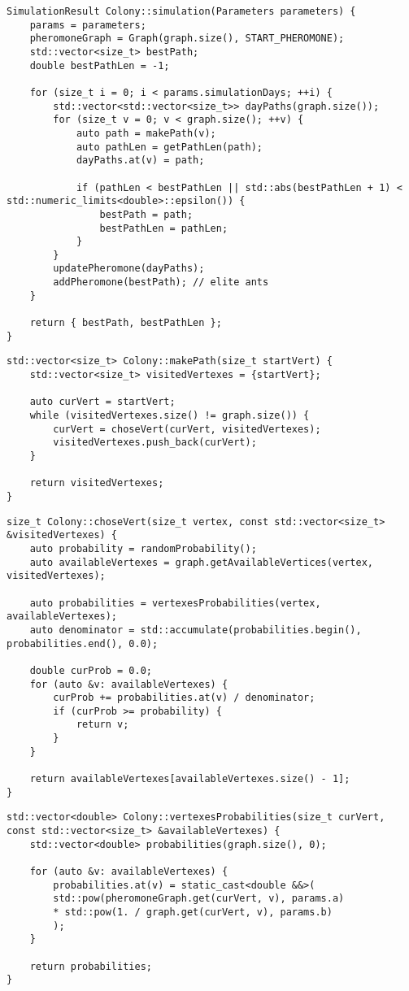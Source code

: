 \clearpage
\begin{lstlisting}[label=lst:ant,caption=Муравьиный алгоритм]
SimulationResult Colony::simulation(Parameters parameters) {
	params = parameters;
	pheromoneGraph = Graph(graph.size(), START_PHEROMONE);
	std::vector<size_t> bestPath;
	double bestPathLen = -1;
	
	for (size_t i = 0; i < params.simulationDays; ++i) {
		std::vector<std::vector<size_t>> dayPaths(graph.size());
		for (size_t v = 0; v < graph.size(); ++v) {
			auto path = makePath(v);
			auto pathLen = getPathLen(path);
			dayPaths.at(v) = path;
			
			if (pathLen < bestPathLen || std::abs(bestPathLen + 1) < std::numeric_limits<double>::epsilon()) {
				bestPath = path;
				bestPathLen = pathLen;
			}
		}
		updatePheromone(dayPaths);
		addPheromone(bestPath); // elite ants
	}
	
	return { bestPath, bestPathLen };
}
\end{lstlisting}

\begin{lstlisting}[label=lst:makePath,caption=Построение маршрута]
std::vector<size_t> Colony::makePath(size_t startVert) {
	std::vector<size_t> visitedVertexes = {startVert};
	
	auto curVert = startVert;
	while (visitedVertexes.size() != graph.size()) {
		curVert = choseVert(curVert, visitedVertexes);
		visitedVertexes.push_back(curVert);
	}
	
	return visitedVertexes;
}
\end{lstlisting}

\begin{lstlisting}[label=lst:nextV,caption=выбор следующей вершины]
size_t Colony::choseVert(size_t vertex, const std::vector<size_t> &visitedVertexes) {
	auto probability = randomProbability();
	auto availableVertexes = graph.getAvailableVertices(vertex, visitedVertexes);
	
	auto probabilities = vertexesProbabilities(vertex, availableVertexes);
	auto denominator = std::accumulate(probabilities.begin(), probabilities.end(), 0.0);
	
	double curProb = 0.0;
	for (auto &v: availableVertexes) {
		curProb += probabilities.at(v) / denominator;
		if (curProb >= probability) {
			return v;
		}
	}
	
	return availableVertexes[availableVertexes.size() - 1];
}
\end{lstlisting}

\begin{lstlisting}[label=lst:prob,caption=получение вероятностей перехода в доступные вершины]
std::vector<double> Colony::vertexesProbabilities(size_t curVert, const std::vector<size_t> &availableVertexes) {
	std::vector<double> probabilities(graph.size(), 0);
	
	for (auto &v: availableVertexes) {
		probabilities.at(v) = static_cast<double &&>(
		std::pow(pheromoneGraph.get(curVert, v), params.a)
		* std::pow(1. / graph.get(curVert, v), params.b)
		);
	}
	
	return probabilities;
}
\end{lstlisting}

